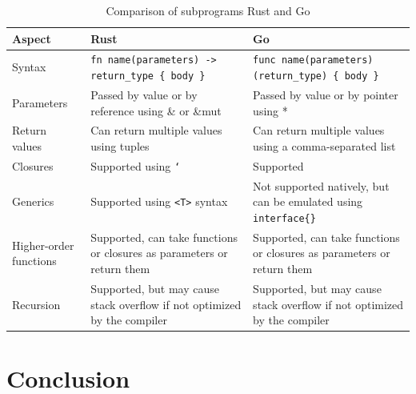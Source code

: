 \documentclass{dclass}
\begin{document}
\begin{table}[htbp]
\centering
\begin{tabular}{|l|p{5.5cm}|p{5.5cm}|}
\hline
\textbf{Aspect} & \textbf{Rust} & \textbf{Go} \\
\hline
Syntax & \texttt{fn name(parameters) -> return\_type \{ body \}} & \texttt{func name(parameters) (return\_type) \{ body \}} \\
\hline
Parameters & Passed by value or by reference using \& or \&mut & Passed by value or by pointer using * \\
\hline
Return values & Can return multiple values using tuples & Can return multiple values using a comma-separated list \\
\hline
Closures & Supported using \texttt{`} & Supported \\
\hline
Generics & Supported using \texttt{<T>} syntax & Not supported natively, but can be emulated using \texttt{interface\{\}} \\
\hline
Higher-order functions & Supported, can take functions or closures as parameters or return them & Supported, can take functions or closures as parameters or return them \\
\hline
Recursion & Supported, but may cause stack overflow if not optimized by the compiler & Supported, but may cause stack overflow if not optimized by the compiler \\
\hline
\end{tabular}
\caption{Comparison of subprograms Rust and Go}
\end{table}

\section{Conclusion}
\end{document}
